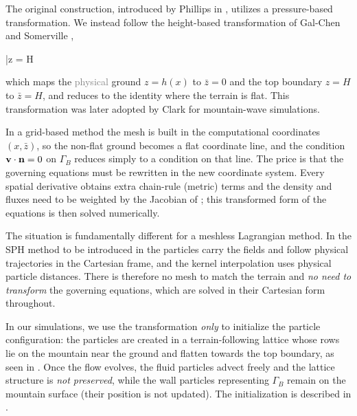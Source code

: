 \documentclass[../main.tex]{subfiles}
\begin{document}
The original construction, introduced by Phillips in \autocite{phillipsCOORDINATESYSTEMHAVING1957}, utilizes a pressure-based transformation. We instead follow the height-based transformation of Gal-Chen and Somerville \autocite{gal-chenUseCoordinateTransformation1975},
\begin{equations}[single,!,numberline=all]
\label{eq:TERRAIN-FOLLOWING}
\bar z = H\,  \eqcomma
\end{equations}
which maps the \textcolor{gray}{physical} ground $z = h(x)$ to $\bar z = 0$ and the top boundary $z = H$ to $\bar z = H$, and reduces to the identity where the terrain is flat. This transformation was later adopted by Clark \autocite{clarkSmallscaleDynamicModel1977} for mountain-wave simulations.

In a grid-based method the mesh is built in the computational coordinates $(x, \bar z)$, so the non-flat ground becomes a flat coordinate line, and the condition $\mathbf{v} \cdot \mathbf{n} = 0$ on $\Gamma_B$ reduces simply to a condition on that line. The price is that the governing equations must be rewritten in the new coordinate system. Every spatial derivative obtains extra chain-rule (metric) terms and the density and fluxes need to be weighted by the Jacobian of ; this transformed form of the equations is then solved numerically.

The situation is fundamentally different for a meshless Lagrangian method. In the SPH method to be introduced in  the particles carry the fields and follow physical trajectories in the Cartesian frame, and the kernel interpolation uses physical particle distances. There is therefore no mesh to match the terrain and \emph{no need to transform} the governing equations, which are solved in their Cartesian form throughout.

In our simulations, we use the transformation  \emph{only} to initialize the particle configuration: the particles are created in a terrain-following lattice whose rows lie on the mountain near the ground and flatten towards the top boundary, as seen in . Once the flow evolves, the fluid particles advect freely and the lattice structure is \emph{not preserved}, while the wall particles representing $\Gamma_B$ remain on the mountain surface (their position is not updated). The initialization is described in .
\end{document}
